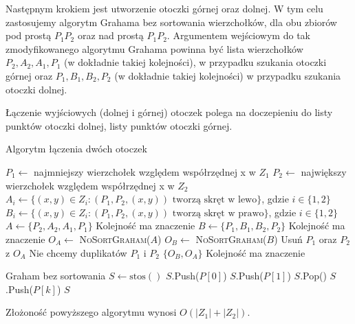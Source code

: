 Następnym krokiem jest utworzenie otoczki górnej oraz dolnej.
W tym celu zastosujemy algorytm Grahama bez sortowania 
wierzchołków, dla obu
zbiorów pod prostą $P_1P_2$ oraz nad prostą $P_1P_2$. 
Argumentem wejściowym do tak zmodyfikowanego algorytmu Grahama 
powinna być lista wierzchołków $P_2, A_2, A_1, P_1$
(w dokładnie takiej kolejności), w 
przypadku szukania otoczki górnej oraz $P_1, B_1, B_2, P_2$
(w dokładnie takiej kolejności) w przypadku
szukania otoczki dolnej.

Łączenie wyjściowych (dolnej i górnej) otoczek polega na 
doczepieniu do listy punktów otoczki dolnej, listy punktów otoczki górnej.

\begin{algorithm}[H]
	\caption{Algorytm łączenia dwóch otoczek}
	\begin{algorithmic}[1]
		\State $P_1 \gets$ najmniejszy wierzchołek względem współrzędnej x w $Z_1$
		\State $P_2 \gets$ największy wierzchołek względem współrzędnej x w $Z_2$
		\State $A_i \gets \{(x, y) \in Z_i : (P_1, P_2, (x,y)) \text{ tworzą skręt w lewo}\}$, gdzie $i \in \{1, 2\}$
		\State $B_i \gets \{(x, y) \in Z_i : (P_1, P_2, (x,y)) \text{ tworzą skręt w prawo}\}$, gdzie $i \in \{1, 2\}$
		\State $A \gets \{P_2, A_2, A_1, P_1\}$ \Comment Kolejność ma znaczenie
		\State $B \gets \{P_1, B_1, B_2, P_2\}$ \Comment Kolejność ma znaczenie
		\State $O_A \gets$ \textsc{NoSortGraham($A$)}
		\State $O_B \gets$ \textsc{NoSortGraham($B$)}
		\State Usuń $P_1$ oraz $P_2$ z $O_A$ \Comment Nie chcemy duplikatów $P_1$ i $P_2$
		\State \Return $\{O_B, O_A\}$ \Comment Kolejność ma znaczenie
		\EndProcedure
		
		 \Comment Graham bez sortowania
		\State $S \gets \text{stos}()$
		\State $S$.Push($P[0]$)
		\State $S$.Push($P[1]$)
		\State $S$.Pop()
		\EndWhile
		\State $S$.Push($P[k]$)
		\EndFor
		\State \Return $S$
		\EndProcedure
	\end{algorithmic}
\end{algorithm}

Złożoność powyższego algorytmu wynosi $O(|Z_1| + |Z_2|)$.